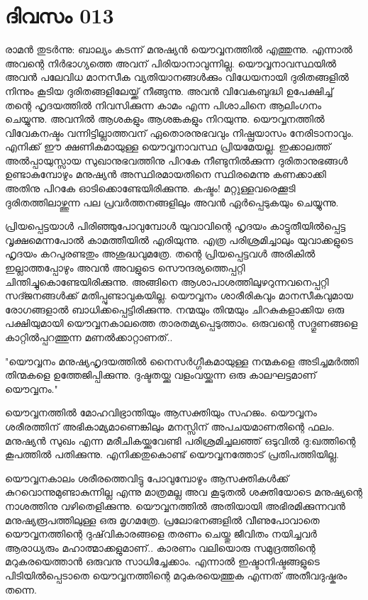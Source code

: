  
\section{ദിവസം 013}


രാമന്‍ തുടര്‍ന്നു: ബാല്യം കടന്ന് മനുഷ്യന്‍ യൌവ്വനത്തില്‍ എത്തുന്നു. എന്നാല്‍ അവന്റെ നിര്‍ഭാഗ്യത്തെ അവന്‌ പിരിയാനാവുന്നില്ല. യൌവ്വനാവസ്ഥയില്‍ അവന്‍ പലേവിധ മാനസീക വ്യതിയാനങ്ങള്‍ക്കും വിധേയനായി ദുരിതങ്ങളില്‍ നിന്നും കൂടിയ ദുരിതങ്ങളിലേയ്ക്ക്‌ നീങ്ങുന്നു. അവന്‍ വിവേകബുദ്ധി ഉപേക്ഷിച്ച്‌ തന്റെ ഹൃദയത്തില്‍ നിവസിക്കുന്ന കാമം എന്ന പിശാചിനെ ആലിംഗനം ചെയ്യുന്നു. അവനില്‍ ആശകളും ആശങ്കകളും നിറയുന്നു. യൌവ്വനത്തില്‍ വിവേകനഷ്ടം വന്നിട്ടില്ലാത്തവന്‌ ഏതൊരനുഭവവും നിഷ്പ്രയാസം നേരിടാനാവും. എനിക്ക്‌ ഈ ക്ഷണികമായുള്ള യൌവ്വനാവസ്ഥ പ്രിയമേയല്ല. ഇക്കാലത്ത്‌ അല്‍പ്പായുസ്സായ സുഖാനുഭവത്തിനു പിറകേ നീണ്ടുനില്‍ക്കുന്ന ദുരിതാനുഭങ്ങള്‍ ഉണ്ടാകുമ്പോഴും മനുഷ്യന്‍ അസ്ഥിരമായതിനെ സ്ഥിരമെന്നു കണക്കാക്കി അതിനു പിറകേ ഓടിക്കൊണ്ടേയിരിക്കുന്നു. കഷ്ടം! മറ്റുള്ളവരെക്കൂടി ദുരിതത്തിലാഴ്ത്തുന്ന പല പ്രവര്‍ത്തനങ്ങളിലും അവന്‍ ഏര്‍പ്പെടുകയും ചെയ്യുന്നു.

പ്രിയപ്പെട്ടയാള്‍ പിരിഞ്ഞുപോവുമ്പോള്‍ യുവാവിന്റെ ഹൃദയം കാട്ടുതീയില്‍പ്പെട്ട വൃക്ഷമെന്നപോല്‍ കാമത്തീയില്‍ എരിയുന്നു. എത്ര പരിശ്രമിച്ചാലും യുവാക്കളുടെ ഹൃദയം കറപുരണ്ടതും അശുദ്ധവുമത്രേ. തന്റെ പ്രിയപ്പെട്ടവള്‍ അരികില്‍ ഇല്ലാത്തപ്പോഴും അവന്‍ അവളുടെ സൌന്ദര്യത്തെപ്പറ്റി ചിന്തിച്ചുകൊണ്ടേയിരിക്കുന്നു. അങ്ങിനെ ആശാപാശത്തിലുഴറുന്നവനെപ്പറ്റി സദ്ജനങ്ങള്‍ക്ക്‌ മതിപ്പുണ്ടാവുകയില്ല. യൌവ്വനം ശാരീരികവും മാനസീകവുമായ രോഗങ്ങളാല്‍ ബാധിക്കപ്പെട്ടിരിക്കുന്നു. നന്മയും തിന്മയും ചിറകുകളാക്കിയ ഒരു പക്ഷിയുമായി യൌവ്വനകാലത്തെ താരതമ്യപ്പെടുത്താം. ഒരുവന്റെ സദ്ഗുണങ്ങളെ കാറ്റില്‍പ്പറത്തുന്ന മണല്‍ക്കാറ്റാണത്‌..

"യൌവ്വനം മനുഷ്യഹൃദയത്തില്‍ നൈസര്‍ഗ്ഗീകമായുള്ള നന്മകളെ അടിച്ചമര്‍ത്തി തിന്മകളെ ഉത്തേജിപ്പിക്കുന്നു. ദുഷ്ടതയ്ക്കു വളംവയ്ക്കുന്ന ഒരു കാലഘട്ടമാണ്‌ യൌവ്വനം."

യൌവ്വനത്തില്‍ മോഹവിഭ്രാന്തിയും ആസക്തിയും സഹജം. യൌവ്വനം ശരീരത്തിന്‌ അഭികാമ്യമാണെങ്കിലും മനസ്സിന്‌ അപചയമാണതിന്റെ ഫലം. മനുഷ്യന്‍ സുഖം എന്ന മരീചികയ്ക്കുവേണ്ടി പരിശ്രമിച്ചലഞ്ഞ്‌ ഒടുവില്‍ ദു:ഖത്തിന്റെ കൂപത്തില്‍ പതിക്കുന്നു. എനിക്കതുകൊണ്ട്‌ യൌവ്വനത്തോട്‌ പ്രതിപത്തിയില്ല. 

യൌവ്വനകാലം ശരീരത്തെവിട്ടു പോവുമ്പോഴും ആസക്തികള്‍ക്ക്‌ കുറവൊന്നുമുണ്ടാകുന്നില്ല എന്നു മാത്രമല്ല അവ കൂടുതല്‍ ശക്തിയോടെ മനുഷ്യന്റെ നാശത്തിനു വഴിതെളിക്കുന്നു. യൌവ്വനത്തില്‍ അതിയായി അഭിരമിക്കുന്നവന്‍ മനുഷ്യരൂപത്തിലുള്ള ഒരു മൃഗമത്രേ. പ്രലോഭനങ്ങളില്‍ വീണുപോവാതെ യൌവ്വനത്തിന്റെ ദുഷ്‌വികാരങ്ങളെ തരണം ചെയ്തു ജീവിതം നയിച്ചവര്‍ ആരാധ്യരും മഹാത്മാക്കളുമാണ്‌.. കാരണം വലിയൊരു സമുദ്രത്തിന്റെ മറുകരയെത്താന്‍ ഒരുവനു സാധിച്ചേക്കാം. എന്നാല്‍ ഇഷ്ടാനിഷ്ടങ്ങളുടെ പിടിയില്‍പ്പെടാതെ യൌവ്വനത്തിന്റെ മറുകരയെത്തുക എന്നത്‌ അതീവദുഷ്കരം തന്നെ.

